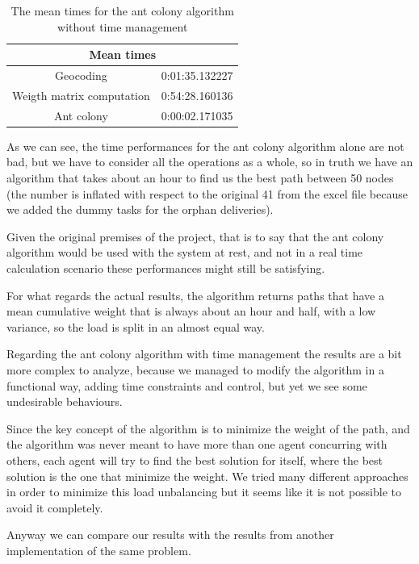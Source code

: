 \documentclass[titlepage]{article}
\begin{document}
\begin{table}[H]
\centering
\begin{tabular}{|c|c|}
\hline
\multicolumn{2}{|c|}{Mean times}\\
\hline
Geocoding & 0:01:35.132227\\
\hline
Weigth matrix computation & 0:54:28.160136\\
\hline
Ant colony & 0:00:02.171035 \\
\hline
\end{tabular}
\caption{The mean times for the ant colony algorithm without time management}
\label{tab:times_1}
\end{table}

As we can see, the time performances for the ant colony algorithm alone are not bad, but we have to consider all the operations as a whole, so in truth we have an algorithm that takes about an hour to find us the best path between 50 nodes (the number is inflated with respect to the original 41 from the excel file because we added the dummy tasks for the orphan deliveries).

Given the original premises of the project, that is to say that the ant colony algorithm would be used with the system at rest, and not in a real time calculation scenario these performances might still be satisfying.

For what regards the actual results, the algorithm returns paths that have a mean cumulative weight that is always about an hour and half, with a low variance, so the load is split in an almost equal way.

Regarding the ant colony algorithm with time management the results are a bit more complex to analyze, because we managed to modify the algorithm in a functional way, adding time constraints and control, but yet we see some undesirable behaviours.

Since the key concept of the algorithm is to minimize the weight of the path, and the algorithm was never meant to have more than one agent concurring with others, each agent will try to find the best solution for itself, where the best solution is the one that minimize the weight. We tried many different approaches in order to minimize this load unbalancing but it seems like it is not possible to avoid it completely.

Anyway we can compare our results with the results from another implementation of the same problem.
\end{document}
